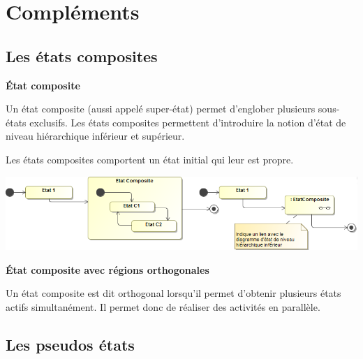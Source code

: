 \documentclass[10pt]{article}
\begin{document}
\section{Compléments}
\subsection{Les états composites}
\begin{defi}
\textbf{État composite}

Un état composite (aussi appelé super-état) permet d’englober plusieurs sous-états exclusifs. 
Les états composites permettent d'introduire la notion d'état de niveau hiérarchique inférieur et supérieur. 

Les états composites comportent un état initial qui leur est propre.

\begin{center}
\includegraphics[width=\textwidth]{images/EtatComposite}
\end{center}
\end{defi}


\begin{defi}
\textbf{État composite avec régions orthogonales}

Un état composite est dit orthogonal lorsqu'il permet d'obtenir plusieurs états actifs simultanément. Il permet donc de réaliser des activités en parallèle. 
\end{defi}
\subsection{Les pseudos états}
\end{document}
